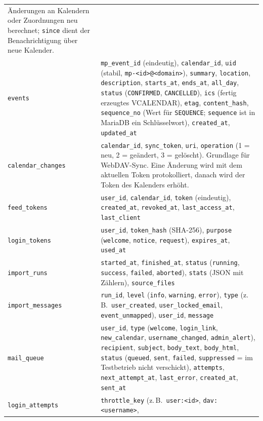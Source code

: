 \documentclass[a4paper,fontsize=10pt]{scrartcl}
\newcommand{\code}[1]{\texttt{#1}}
\begin{document}
\begin{longtable}{L{3.2cm}L{11.6cm}}
Änderungen an Kalendern oder Zuordnungen neu berechnet; \code{since} dient
der Benachrichtigung über neue Kalender. \\
\addlinespace
\code{events} &
\code{mp\_event\_id} (eindeutig), \code{calendar\_id}, \code{uid}
(stabil, \code{mp-<id>@<domain>}), \code{summary}, \code{location},
\code{description}, \code{starts\_at}, \code{ends\_at}, \code{all\_day},
\code{status} (\code{CONFIRMED}, \code{CANCELLED}), \code{ics} (fertig
erzeugtes VCALENDAR), \code{etag}, \code{content\_hash},
\code{sequence\_no} (Wert für \code{SEQUENCE}; \code{sequence} ist in
MariaDB ein Schlüsselwort), \code{created\_at}, \code{updated\_at} \\
\addlinespace
\code{calendar\_changes} &
\code{calendar\_id}, \code{sync\_token}, \code{uri}, \code{operation}
(1 = neu, 2 = geändert, 3 = gelöscht). Grundlage für WebDAV-Sync. Eine
Änderung wird mit dem aktuellen Token protokolliert, danach wird der Token
des Kalenders erhöht. \\
\addlinespace
\code{feed\_tokens} &
\code{user\_id}, \code{calendar\_id}, \code{token} (eindeutig),
\code{created\_at}, \code{revoked\_at}, \code{last\_access\_at},
\code{last\_client} \\
\addlinespace
\code{login\_tokens} &
\code{user\_id}, \code{token\_hash} (SHA-256), \code{purpose}
(\code{welcome}, \code{notice}, \code{request}), \code{expires\_at},
\code{used\_at} \\
\addlinespace
\code{import\_runs} &
\code{started\_at}, \code{finished\_at}, \code{status} (\code{running},
\code{success}, \code{failed}, \code{aborted}), \code{stats} (JSON mit
Zählern), \code{source\_files} \\
\addlinespace
\code{import\_messages} &
\code{run\_id}, \code{level} (\code{info}, \code{warning}, \code{error}),
\code{type} (z.\,B.\ \code{user\_created}, \code{user\_locked\_email},
\code{event\_unmapped}), \code{user\_id}, \code{message} \\
\addlinespace
\code{mail\_queue} &
\code{user\_id}, \code{type} (\code{welcome}, \code{login\_link},
\code{new\_calendar}, \code{username\_changed}, \code{admin\_alert}),
\code{recipient},
\code{subject}, \code{body\_text}, \code{body\_html}, \code{status}
(\code{queued}, \code{sent}, \code{failed}, \code{suppressed} =
im Testbetrieb nicht verschickt), \code{attempts},
\code{next\_attempt\_at}, \code{last\_error}, \code{created\_at},
\code{sent\_at} \\
\addlinespace
\code{login\_attempts} &
\code{throttle\_key} (z.\,B.\ \code{user:<id>}, \code{dav:<username>},

\end{longtable}
\end{document}
